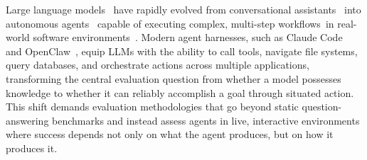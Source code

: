 \documentclass{article}
\begin{document}
Large language models~\citep{gpt54,opus46,gemini31pro} have rapidly evolved from conversational assistants~\citep{ouyang2022training, zhao2023survey} into autonomous agents~\citep{yao2022react,schick2023toolformer} capable of executing complex, multi-step workflows~\citep{shen2023hugginggpt,qiao2023taskweaver,qiao2023taskweaver}in real-world software environments~\citep{jimenez2024swebench,xie2024osworld}.
Modern agent harnesses, such as Claude Code~\citep{claudecode} and OpenClaw~\citep{openclaw}, equip LLMs with the ability to call tools, navigate file systems, query databases, and orchestrate actions across multiple applications, transforming the central evaluation question from whether a model possesses knowledge to whether it can reliably accomplish a goal through situated action.
This shift demands evaluation methodologies that go beyond static question-answering benchmarks and instead assess agents in live, interactive environments where success depends not only on what the agent produces, but on how it produces it.
\end{document}
